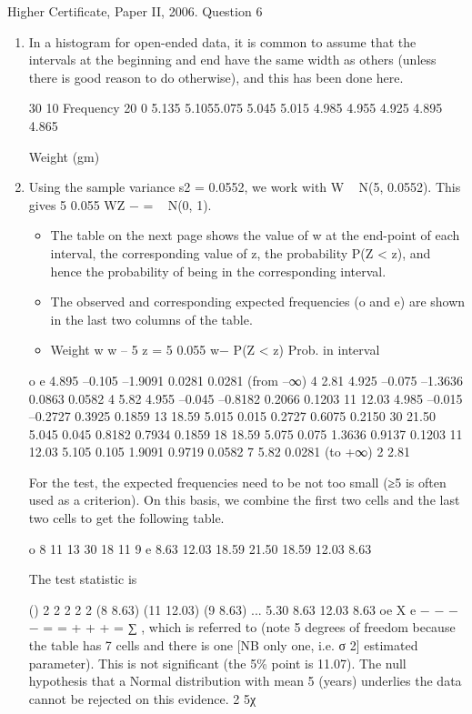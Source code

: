 \documentclass[a4paper,12pt]{article}
\begin{document}
Higher Certificate, Paper II, 2006.  Question 6 
\begin{enumerate} 
\item In a histogram for open-ended data, it is common to assume that the intervals at the beginning and end have the same width as others (unless there is good reason to do otherwise), and this has been done here. 
 
 
 
 
  
 
 
 
 
 
 
 
 
 
 
 
 
 
 
 
 
 
 
 
 
 
 30 
10 
Frequency 
20 
  0 
5.135 5.1055.075 5.045 5.015 4.985 4.955 4.925 4.895 4.865 
 
Weight (gm)  
 
 
\item  Using the sample variance s2 = 0.0552, we work with W ~ N(5, 0.0552).  This gives 5 0.055 WZ − = ~ N(0, 1). 

\begin{itemize}
\item The table on the next page shows the value of w at the end-point of each interval, the corresponding value of z, the probability P(Z < z), and hence the probability of being in the corresponding interval.  
\item The observed and corresponding expected frequencies (o and e) are shown in the last two columns of the table. 
\item 
Weight w w – 5 z = 5 0.055 w− P(Z < z) Prob. in interval
\end{itemize}
 o e 
4.895 –0.105 –1.9091 0.0281 0.0281 (from –∞)   4   2.81 4.925 –0.075 –1.3636 0.0863 0.0582    4   5.82 4.955 –0.045 –0.8182 0.2066 0.1203  11 12.03 4.985 –0.015 –0.2727 0.3925 0.1859  13 18.59 5.015   0.015   0.2727 0.6075 0.2150  30 21.50 5.045   0.045   0.8182 0.7934 0.1859  18 18.59 5.075   0.075   1.3636 0.9137 0.1203  11 12.03 5.105   0.105   1.9091 0.9719 0.0582    7   5.82     0.0281 (to +∞)   2   2.81 
 
 
For the test, the expected frequencies need to be not too small (≥5 is often used as a criterion).  On this basis, we combine the first two cells and the last two cells to get the following table. 
 
 
o 8 11 13 30 18 11 9 e 8.63 12.03 18.59 21.50 18.59 12.03 8.63 
 
 
The test statistic is 
 
     
() 2 2 2 2 2 (8 8.63) (11 12.03) (9 8.63) ... 5.30 8.63 12.03 8.63 oe
X
e − − − − = = + + + = ∑ , 
 which is referred to  (note 5 degrees of freedom because the table has 7 cells and there is one [NB only one, i.e. σ 2] estimated parameter).  This is not significant (the 5\% point is 11.07).  The null hypothesis that a Normal distribution with mean 5 (years) underlies the data cannot be rejected on this evidence. 2 5χ
 \end{enumerate}
 
\end{document}
